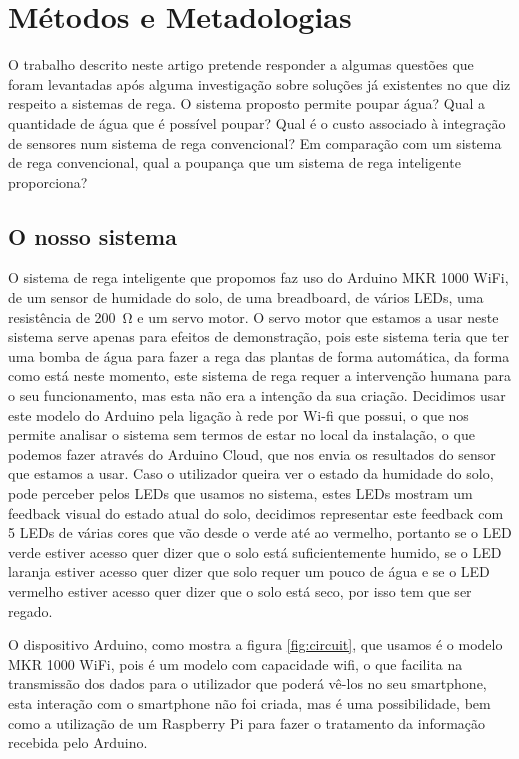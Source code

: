 \documentclass[conference]{IEEEtran}
\begin{document}
\section{Métodos e Metadologias}

O trabalho descrito neste artigo pretende responder a algumas questões que foram
levantadas após alguma investigação sobre soluções já existentes no que diz respeito
a sistemas de rega. O sistema proposto permite poupar água? Qual a quantidade de água
que é possível poupar?  Qual é o custo associado à integração de sensores num sistema
de rega convencional? Em comparação com um sistema de rega convencional,
qual a poupança que um sistema de rega inteligente proporciona?

\subsection{O nosso sistema}

O sistema de rega inteligente que propomos faz uso do Arduino MKR 1000 WiFi,
de um sensor de humidade do solo, de uma breadboard, de vários LEDs, uma
resistência de \SI{200}{\ohm} e um servo motor. O servo motor que estamos a
usar neste sistema serve apenas para efeitos de demonstração, pois
este sistema teria que ter uma bomba de água para fazer a rega
das plantas de forma automática, da forma como está neste momento, este
sistema de rega requer a intervenção humana para o seu funcionamento, mas
esta não era a intenção da sua criação.
Decidimos usar este modelo do Arduino pela ligação
à rede por Wi-fi que possui, o que nos permite analisar o sistema sem termos de
estar no local da instalação, o que podemos fazer através do Arduino Cloud,
que nos envia os resultados do sensor que estamos a usar. Caso o utilizador
queira ver o estado da humidade do solo, pode perceber pelos LEDs que usamos no sistema,
estes LEDs mostram um feedback visual do estado atual do solo, decidimos representar este
feedback com 5 LEDs de várias cores que vão desde o verde até ao vermelho, portanto
se o LED verde estiver acesso quer dizer que o solo está suficientemente humido, se
o LED laranja estiver acesso quer dizer que solo requer um pouco de água e se o LED
vermelho estiver acesso quer dizer que o solo está seco, por isso tem que ser regado.

O dispositivo Arduino, como mostra a figura \ref{fig:circuit}, que usamos é o
modelo MKR 1000 WiFi, pois é um modelo com capacidade wifi, o que facilita na
transmissão dos dados para o utilizador que poderá vê-los no seu smartphone,
esta interação com o smartphone não foi criada, mas é uma possibilidade, bem
como a utilização de um Raspberry Pi para fazer o tratamento da informação
recebida pelo Arduino.
\end{document}
